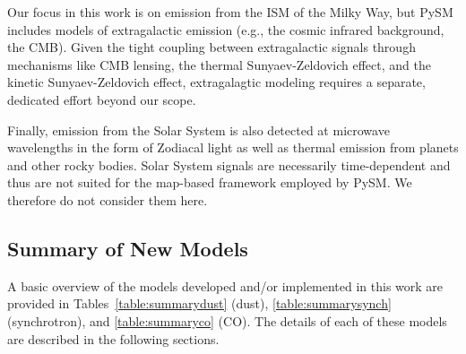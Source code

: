 \documentclass[twocolumn]{aastex631}
\begin{document}
Our focus in this work is on emission from the ISM of the Milky Way, but PySM includes models of extragalactic emission (e.g., the cosmic infrared background, the CMB). Given the tight coupling between extragalactic signals through mechanisms like CMB lensing, the thermal Sunyaev-Zeldovich effect, and the kinetic Sunyaev-Zeldovich effect, extragalagtic modeling requires a separate, dedicated effort beyond our scope.

Finally, emission from the Solar System is also detected at microwave wavelengths in the form of Zodiacal light as well as thermal emission from planets and other rocky bodies. Solar System signals are necessarily time-dependent and thus are not suited for the map-based framework employed by PySM. We therefore do not consider them here.

\subsection{Summary of New Models}
A basic overview of the models developed and/or implemented in this work are provided in Tables~\ref{table:summarydust} (dust), \ref{table:summarysynch} (synchrotron), and \ref{table:summaryco} (CO). The details of each of these models are described in the following sections.
\end{document}
